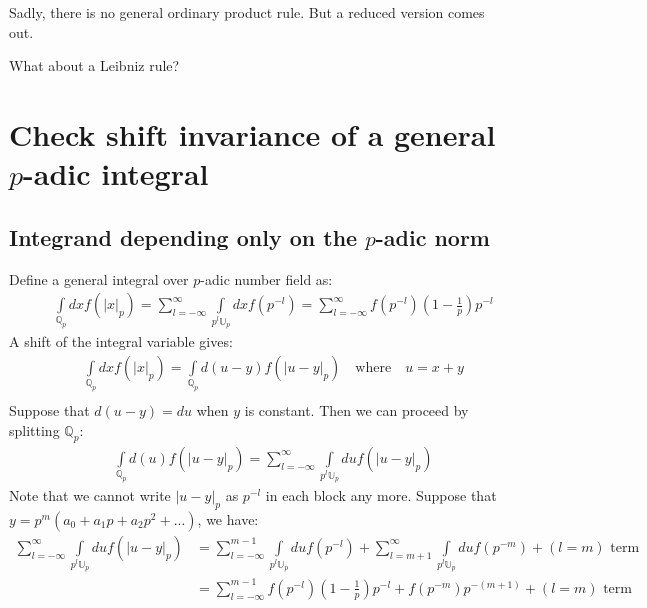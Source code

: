 \documentclass[12pt]{article}
\begin{document}
Sadly, there is no general ordinary product rule. But a reduced version comes out.

What about a Leibniz rule?
\section{Check shift invariance of a general $p$-adic integral}
\subsection{Integrand depending only on the $p$-adic norm}
Define a general integral over $p$-adic number field as:
\begin{equation}
\begin{aligned}
&\quad \int\limits_{\mathbb{Q}_p} dx f(|x|_p)=\sum\limits_{l=-\infty}^{\infty}\int\limits_{p^l\mathbb{U}_p}dx f(p^{-l})=\sum\limits_{l=-\infty}^{\infty}f(p^{-l})(1-\frac{1}{p})p^{-l}
\end{aligned}
\end{equation}
A shift of the integral variable gives:
\begin{equation}
\begin{aligned}
&\quad \int\limits_{\mathbb{Q}_p} dx f(|x|_p)=\int\limits_{\mathbb{Q}_p} d(u-y) f(|u-y|_p) \quad\text{where}\quad u=x+y \\
\end{aligned}
\end{equation}
Suppose that $d(u-y)=du$ when $y$ is constant. Then we can proceed by splitting $\mathbb{Q}_p$:
\begin{equation}
\begin{aligned}
&\quad \int\limits_{\mathbb{Q}_p} d(u) f(|u-y|_p)=\sum\limits_{l=-\infty}^{\infty}\int\limits_{p^l\mathbb{U}_p}du f(|u-y|_p)
\end{aligned}
\end{equation}
Note that we cannot write $|u-y|_p$ as $p^{-l}$ in each block any more. Suppose that $y=p^m(a_0+a_1 p+a_2 p^2+...)$, we have:
\begin{equation}
\begin{aligned}
\sum\limits_{l=-\infty}^{\infty}\int\limits_{p^l\mathbb{U}_p}du f(|u-y|_p)&=\sum\limits_{l=-\infty}^{m-1}\int\limits_{p^l\mathbb{U}_p}du f(p^{-l})+\sum\limits_{l=m+1}^{\infty}\int\limits_{p^l\mathbb{U}_p}du f(p^{-m})+(l=m)\text{ term}\\
&=\sum\limits_{l=-\infty}^{m-1}f(p^{-l})(1-\frac{1}{p})p^{-l}+f(p^{-m})p^{-(m+1)}+(l=m)\text{ term}
\end{aligned}
\end{equation}
\end{document}

